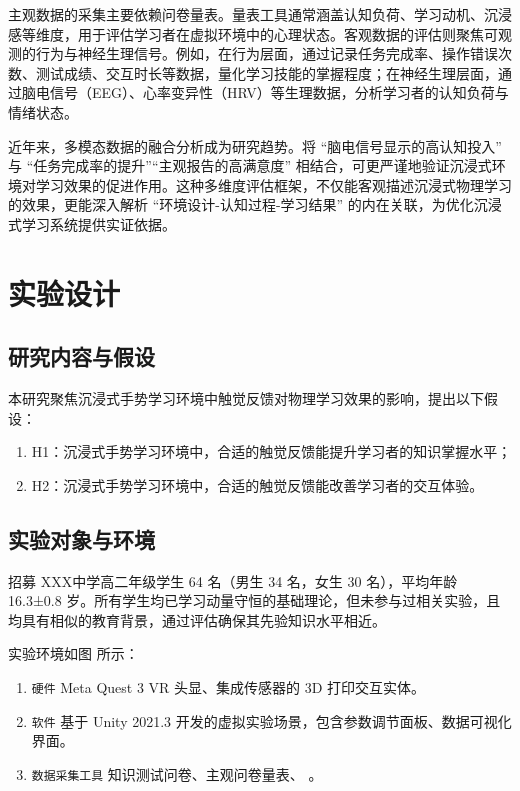\documentclass[runningheads]{llncs}
\begin{document}
主观数据的采集主要依赖问卷量表。量表工具通常涵盖认知负荷\cite{sweller1988cognitive}、学习动机\cite{keller1987development}、沉浸感\cite{sherman2003understanding}等维度，用于评估学习者在虚拟环境中的心理状态。客观数据的评估则聚焦可观测的行为\cite{Mayer01012003}与神经生理信号。例如，在行为层面，通过记录任务完成率、操作错误次数、测试成绩、交互时长等数据，量化学习技能的掌握程度；在神经生理层面，通过脑电信号（EEG）、心率变异性（HRV）等生理数据，分析学习者的认知负荷与情绪状态。

近年来，多模态数据的融合分析成为研究趋势。将 “脑电信号显示的高认知投入” 与 “任务完成率的提升”“主观报告的高满意度” 相结合，可更严谨地验证沉浸式环境对学习效果的促进作用\cite{DUBOVI2022104495}。这种多维度评估框架，不仅能客观描述沉浸式物理学习的效果，更能深入解析 “环境设计-认知过程-学习结果” 的内在关联，为优化沉浸式学习系统提供实证依据。

\section{实验设计}
\subsection{研究内容与假设}
本研究聚焦沉浸式手势学习环境中触觉反馈对物理学习效果的影响，提出以下假设：

\begin{enumerate}[label={$\bullet$}]
  \item H1：沉浸式手势学习环境中，合适的触觉反馈能提升学习者的知识掌握水平；
  \item H2：沉浸式手势学习环境中，合适的触觉反馈能改善学习者的交互体验。
\end{enumerate}

\subsection{实验对象与环境}

招募
XXX中学高二年级学生 64 名（男生 34 名，女生 30 名），平均年龄 16.3±0.8 岁。所有学生均已学习动量守恒的基础理论，但未参与过相关实验，且均具有相似的教育背景，通过评估确保其先验知识水平相近。

实验环境如图
所示：

\begin{enumerate}[label={$\bullet$}]
  \item \texttt{硬件} Meta Quest 3 VR 头显、集成传感器的 3D 打印交互实体。
  \item \texttt{软件} 基于 Unity 2021.3 开发的虚拟实验场景，包含参数调节面板、数据可视化界面。
  \item \texttt{数据采集工具} 知识测试问卷、主观问卷量表、
  。
\end{enumerate}
\end{document}

